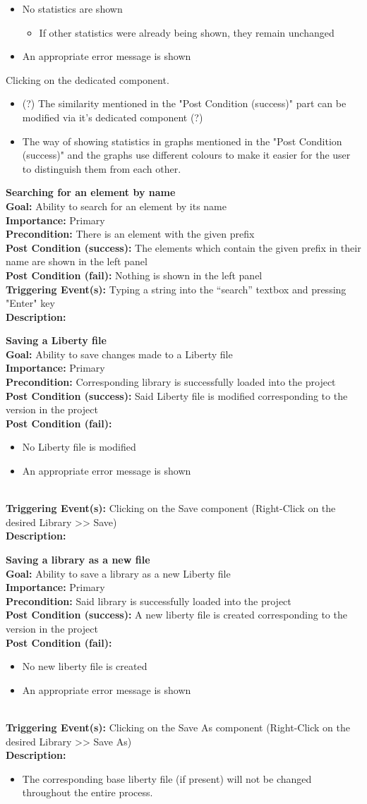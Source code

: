 \documentclass[10pt,a4paper]{report}
\newcommand{\precondition}[1]{
    \textbf{Precondition: } #1 \leavevmode \\
}
\newcommand{\FRDescription}[8]{
    \textbf{#1} \leavevmode \\
    \textbf{Goal: } #2 \leavevmode \\
    \textbf{Importance: } #3 \leavevmode \\
    \precondition{#4}
    \textbf{Post Condition (success): } #5 \leavevmode \\
    \textbf{Post Condition (fail): } #6 \leavevmode \\
    \textbf{Triggering Event(s): } #7 \leavevmode \\
    \textbf{Description: } \leavevmode \\ 
    #8}
\begin{document}
\begin{FR}
{\begin{itemize}
    \end{itemize}}
    {\begin{itemize}
        \item No statistics are shown
        \begin{itemize}
            \item If other statistics were already being shown, they remain unchanged
        \end{itemize}
        \item An appropriate error message is shown
    \end{itemize}}
    {Clicking on the dedicated component.}
    {\begin{itemize}
        \item (?) The similarity mentioned in the "Post Condition (success)" part can be modified via it's dedicated component (?)
        \item The way of showing statistics in graphs mentioned in the "Post Condition (success)" and the graphs use different colours to make it easier for the user to distinguish them from each other.
    \end{itemize}}
    \item \FRDescription{Searching for an element by name}
    {Ability to search for an element by its name}
    {Primary}
    {There is an element with the given prefix}
    {The elements which contain the given prefix in their name are shown in the left panel}
    {Nothing is shown in the left panel}
    {Typing a string into the “search” textbox and pressing "Enter" key}
    \item \FRDescription{Saving a Liberty file}
    {Ability to save changes made to a Liberty file}
    {Primary}
    {Corresponding library is successfully loaded into the project}
    {Said Liberty file is modified corresponding to the version in the project}
    {\begin{itemize}
        \item No Liberty file is modified
        \item An appropriate error message is shown
    \end{itemize}}
    {Clicking on the Save component (Right-Click on the desired Library  >> Save)}
    \item \FRDescription{Saving a library as a new file}
    {Ability to save a library as a new Liberty file}
    {Primary}
    {Said library is successfully loaded into the project}
    {A new liberty file is created corresponding to the version in the project}
    {\begin{itemize}
        \item No new liberty file is created
        \item An appropriate error message is shown
    \end{itemize}}
    {Clicking on the Save As component (Right-Click on the desired Library  >> Save As)}
    {\begin{itemize}
        \item The corresponding base liberty file (if present) will not be changed throughout the entire process.
    \end{itemize}}
\end{FR}
\end{document}

